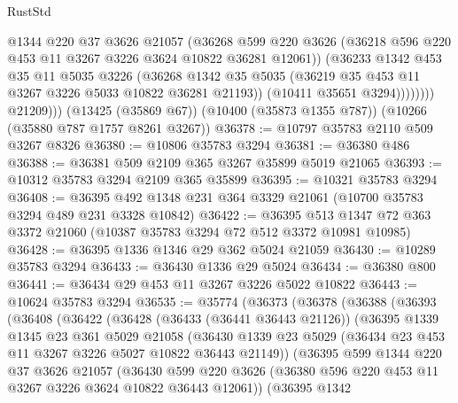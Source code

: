 \begin{lexlean}{RustStd}
\begin{coremodule}
{\begin{coremodule}
{{{{{{{{{{{{{{{{{{{{{{{{{                      @1344
                      @220
                      @37
                      @3626
                      @21057
                      (@36268
                        @599
                        @220
                        @3626
                        (@36218 @596 @220 @453 @11 @3267 @3226 @3624 @10822 @36281 @12061))
                      (@36233
                        @1342
                        @453
                        @35
                        @11
                        @5035
                        @3226
                        (@36268
                          @1342
                          @35
                          @5035
                          (@36219 @35 @453 @11 @3267 @3226 @5033 @10822 @36281 @21193))
                        (@10411 @35651 @3294))))))))
          @21209)))
    (@13425 (@35869 @67))
    (@10400 (@35873 @1355 @787))
    (@10266 (@35880 @787 @1757 @8261 @3267))
@36378 := @10797 @35783 @2110 @509 @3267 @8326
@36380 := @10806 @35783 @3294
@36381 := @36380 @486
@36388 := @36381 @509 @2109 @365 @3267 @35899 @5019 @21065
@36393 := @10312 @35783 @3294 @2109 @365 @35899
@36395 := @10321 @35783 @3294
@36408 := @36395 @492 @1348 @231 @364 @3329 @21061 (@10700 @35783 @3294 @489 @231 @3328 @10842)
@36422 := @36395 @513 @1347 @72 @363 @3372 @21060 (@10387 @35783 @3294 @72 @512 @3372 @10981 @10985)
@36428 := @36395 @1336 @1346 @29 @362 @5024 @21059
@36430 := @10289 @35783 @3294
@36433 := @36430 @1336 @29 @5024
@36434 := @36380 @800
@36441 := @36434 @29 @453 @11 @3267 @3226 @5022 @10822
@36443 := @10624 @35783 @3294
@36535 := @35774
    (@36373
      (@36378
        (@36388
          (@36393
            (@36408
              (@36422
                (@36428
                  (@36433 (@36441 @36443 @21126))
                  (@36395
                    @1339
                    @1345
                    @23
                    @361
                    @5029
                    @21058
                    (@36430
                      @1339
                      @23
                      @5029
                      (@36434 @23 @453 @11 @3267 @3226 @5027 @10822 @36443 @21149))
                    (@36395
                      @599
                      @1344
                      @220
                      @37
                      @3626
                      @21057
                      (@36430
                        @599
                        @220
                        @3626
                        (@36380 @596 @220 @453 @11 @3267 @3226 @3624 @10822 @36443 @12061))
                      (@36395
                        @1342
}}}}}}}}}}}}}}}}}}}}}}}}}
\end{coremodule}}
\end{coremodule}
\end{lexlean}
